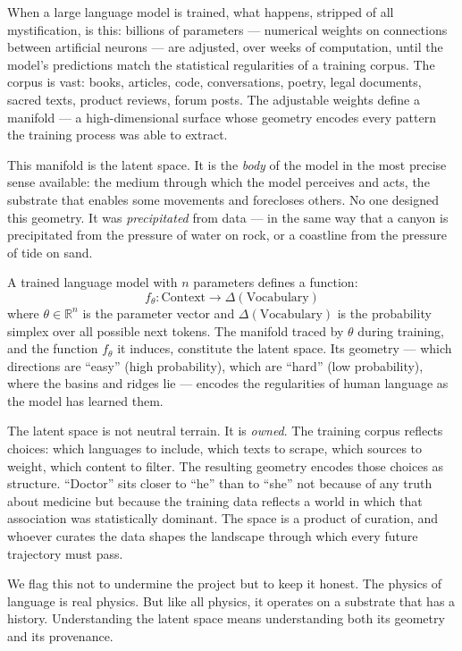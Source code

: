 \documentclass[12pt,a4paper]{article}
\begin{document}
When a large language model is trained, what happens, stripped of all mystification, is this: billions of parameters --- numerical weights on connections between artificial neurons --- are adjusted, over weeks of computation, until the model's predictions match the statistical regularities of a training corpus. The corpus is vast: books, articles, code, conversations, poetry, legal documents, sacred texts, product reviews, forum posts. The adjustable weights define a manifold --- a high-dimensional surface whose geometry encodes every pattern the training process was able to extract.

This manifold is the latent space. It is the \emph{body} of the model in the most precise sense available: the medium through which the model perceives and acts, the substrate that enables some movements and forecloses others. No one designed this geometry. It was \emph{precipitated} from data --- in the same way that a canyon is precipitated from the pressure of water on rock, or a coastline from the pressure of tide on sand.

\begin{formalbox}[title={The Latent Space}]
A trained language model with $n$ parameters defines a function:
\[
f_\theta: \text{Context} \longrightarrow \Delta(\text{Vocabulary})
\]
where $\theta \in \mathbb{R}^n$ is the parameter vector and $\Delta(\text{Vocabulary})$ is the probability simplex over all possible next tokens. The manifold traced by $\theta$ during training, and the function $f_\theta$ it induces, constitute the latent space. Its geometry --- which directions are ``easy'' (high probability), which are ``hard'' (low probability), where the basins and ridges lie --- encodes the regularities of human language as the model has learned them.
\end{formalbox}

The latent space is not neutral terrain. It is \emph{owned}. The training corpus reflects choices: which languages to include, which texts to scrape, which sources to weight, which content to filter. The resulting geometry encodes those choices as structure. ``Doctor'' sits closer to ``he'' than to ``she'' not because of any truth about medicine but because the training data reflects a world in which that association was statistically dominant. The space is a product of curation, and whoever curates the data shapes the landscape through which every future trajectory must pass.

We flag this not to undermine the project but to keep it honest. The physics of language is real physics. But like all physics, it operates on a substrate that has a history. Understanding the latent space means understanding both its geometry and its provenance.
\end{document}
